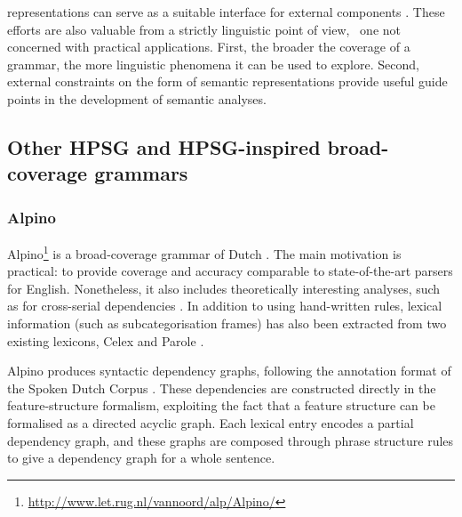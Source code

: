\documentclass[output=paper,nonflat]{langsci/langscibook}
\begin{document}
representations can serve as a suitable interface for external
components \citep[\eg][]{flickinger2005sem}. 
These efforts are also valuable from a strictly linguistic point of view, \ie\ one not concerned with practical applications.
First, the broader the coverage of a grammar,
the more linguistic phenomena it can be used to explore.
Second, external constraints on the form of semantic representations provide
useful guide points in the development of semantic analyses. 


\subsection{Other HPSG and HPSG-inspired broad-coverage grammars}
\label{cl:othergrammars}

\subsubsection{Alpino}
\label{cl:other:alpino}

Alpino\footnote{%
	\url{http://www.let.rug.nl/vannoord/alp/Alpino/}
}
is a broad-coverage grammar of Dutch
\citep{BvNM2001a-u,vannoord2005alpino,vannoord2006alpino}.
The main motivation is practical: to provide coverage and accuracy
comparable to state-of-the-art parsers for English.
Nonetheless, it also includes theoretically interesting analyses,
such as for cross-serial dependencies \citep{BvN98a}.
In addition to using hand-written rules,
lexical information (such as subcategorisation frames) has also been extracted from two existing lexicons,
Celex \citep{baayen1995celex}
and Parole \citep{kruyt1997parole}.

Alpino produces syntactic dependency graphs,
following the annotation format of the Spoken Dutch Corpus \citep{oostdijk2000corpus}.
These dependencies are constructed directly in the feature-structure formalism,
exploiting the fact that a feature structure can be formalised as a directed acyclic graph.
Each lexical entry encodes a partial dependency graph,
and these graphs are composed through phrase structure rules
to give a dependency graph for a whole sentence.
\end{document}
